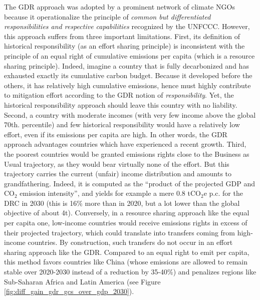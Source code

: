 The GDR approach was adopted by a prominent network of climate NGOs because it operationalize the principle of \textit{common but differentiated responsibilities and respective capabilities} recognized by the UNFCCC. However, this approach suffers from three important limitations. First, its definition of historical responsibility (as an effort sharing principle) is inconsistent with the principle of an equal right of cumulative emissions per capita (which is a resource sharing principle). Indeed, imagine a country that is fully decarbonized and has exhausted exactly its cumulative carbon budget. Because it developed before the others, it has relatively high cumulative emissions, hence must highly contribute to mitigation effort according to the GDR notion of \textit{responsibility}. Yet, the historical responsibility approach should leave this country with no liability. 
Second, a country with moderate incomes (with very few income above the global 70th. percentile) and few historical responsibility would have a relatively low effort, even if its emissions per capita are high. In other words, the GDR approach advantages countries which have experienced a recent growth. %
Third, the poorest countries would be granted emissions rights close to the Business as Usual trajectory, as they would bear virtually none of the effort. But this trajectory carries the current (unfair) income distribution and amounts to grandfathering. Indeed, it is computed as the ``product of the projected GDP and CO$_\text{2}$ emission intensity'', and yields for example a mere 0.8 tCO$_\text{2}$e p.c. for the DRC in 2030 (this is 16\% more than in 2020, but a lot lower than the global objective of about 4t). Conversely, in a resource sharing approach like the equal per capita one, low-income countries would receive emissions rights in excess of their projected trajectory, which could translate into transfers coming from high-income countries. By construction, such transfers do not occur in an effort sharing approach like the GDR. 
Compared to an equal right to emit per capita, this method favors countries like China (whose emissions are allowed to remain stable over 2020-2030 instead of a reduction by 35-40\%) and penalizes regions like Sub-Saharan Africa and Latin America (see Figure \ref{fig:diff_gain_gdr_gcs_over_gdp_2030}). 

